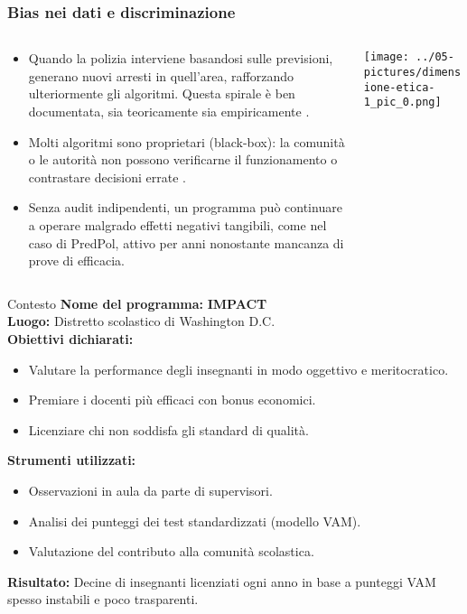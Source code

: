 \documentclass{beamer}
\begin{document}
%
%
\begin{frame}
\frametitle{Bias nei dati e discriminazione}
\begin{columns}[T] %
\begin{column}{.48\textwidth}
        \begin{itemize}
        \small
		\item Quando la polizia interviene basandosi sulle previsioni, generano nuovi arresti in quell’area, rafforzando ulteriormente gli algoritmi. Questa spirale è ben documentata, sia teoricamente sia empiricamente . 
		\item Molti algoritmi sono proprietari (black-box): la comunità o le autorità non possono verificarne il funzionamento o contrastare decisioni errate .
\item Senza audit indipendenti, un programma può continuare a operare malgrado effetti negativi tangibili, come nel caso di PredPol, attivo per anni nonostante mancanza di prove di efficacia.
        \end{itemize}
\end{column}%
\hfill%
\begin{column}{.48\textwidth}
        \texttt{[image: ../05-pictures/dimensione-etica-1\_pic\_0.png]}
\end{column}%
\end{columns}
\end{frame}
%
%
\begin{frame}{Contesto}
\textbf{Nome del programma:} \textbf{IMPACT}\\
\textbf{Luogo:} Distretto scolastico di Washington D.C.\\
\textbf{Obiettivi dichiarati:}
\begin{itemize}
  \item Valutare la performance degli insegnanti in modo oggettivo e meritocratico.
  \item Premiare i docenti pi\`u efficaci con bonus economici.
  \item Licenziare chi non soddisfa gli standard di qualit\`a.
\end{itemize}

\textbf{Strumenti utilizzati:}
\begin{itemize}
  \item Osservazioni in aula da parte di supervisori.
  \item Analisi dei punteggi dei test standardizzati (modello VAM).
  \item Valutazione del contributo alla comunit\`a scolastica.
\end{itemize}

\textbf{Risultato:} Decine di insegnanti licenziati ogni anno in base a punteggi VAM spesso instabili e poco trasparenti.
\end{frame}
\end{document}
